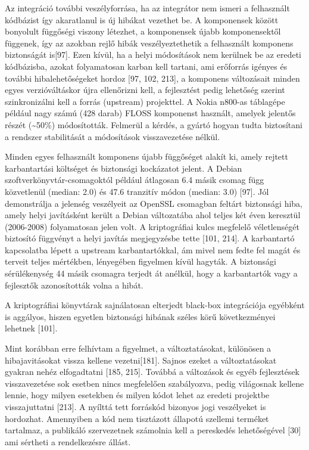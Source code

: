 \documentclass[12pt,magyar,a4paper,oneside]{scrreprt}
\begin{document}
Az integráció további veszélyforrása, ha az integrátor nem ismeri a
felhasznált kódbázist így akaratlanul is új hibákat vezethet be. A
komponensek között bonyolult függőségi viszony létezhet, a komponensek
újabb komponensektől függenek, így az azokban rejlő hibák
veszélyeztethetik a felhasznált komponens biztonságát is{[}97{]}. Ezen
kívül, ha a helyi módosítások nem kerülnek be az eredeti kódbázisba,
azokat folyamatosan karban kell tartani, ami erőforrás igényes és
további hibalehetőségeket hordoz {[}97, 102, 213{]}, a komponens
változásait minden egyes verzióváltáskor újra ellenőrizni kell, a
fejlesztést pedig lehetőség szerint szinkronizálni kell a forrás
(upstream) projekttel. A Nokia n800-as táblagépe például nagy számú (428
darab) FLOSS komponenst használt, amelyek jelentős részét
(\textasciitilde{}50\%) módosították. Felmerül a kérdés, a gyártó hogyan
tudta biztosítani a rendszer stabilitását a módosítások visszavezetése
nélkül.

Minden egyes felhasznált komponens újabb függőséget alakít ki, amely
rejtett karbantartási költséget és biztonsági kockázatot jelent. A
Debian szoftverkönyvtár-csomagoktól például átlagosan 6.4 másik csomag
függ közvetlenül (median: 2.0) és 47.6 tranzitív módon (median: 3.0)
{[}97{]}. Jól demonstrálja a jelenség veszélyeit az OpenSSL csomagban
feltárt biztonsági hiba, amely helyi javításként került a Debian
változatába ahol teljes két éven keresztül (2006-2008) folyamatosan
jelen volt. A kriptográfiai kulcs megfelelő véletlenségét biztosító
függvényt a helyi javítás megjegyzésbe tette {[}101, 214{]}. A
karbantartó kapcsolatba lépett a upstream karbantartókkal, ám mivel nem
fedte fel magát és terveit teljes mértékben, lényegében figyelmen kívül
hagyták. A biztonsági sérülékenység 44 másik csomagra terjedt át
anélkül, hogy a karbantartók vagy a fejlesztők azonosították volna a
hibát.

A kriptográfiai könyvtárak sajnálatosan elterjedt black-box integrációja
egyébként is aggályos, hiszen egyetlen biztonsági hibának széles körű
következményei lehetnek {[}101{]}.

Mint korábban erre felhívtam a figyelmet, a változtatásokat, különösen a
hibajavitásokat vissza kellene vezetni{[}181{]}. Sajnos ezeket a
változtatásokat gyakran nehéz elfogadtatni {[}185, 215{]}. Továbbá a
változások és egyéb fejlesztések visszavezetése sok esetben nincs
megfelelően szabályozva, pedig világosnak kellene lennie, hogy milyen
esetekben és milyen kódot lehet az eredeti projektbe visszajuttatni
{[}213{]}. A nyílttá tett forráskód bizonyos jogi veszélyeket is
hordozhat. Amennyiben a kód nem tisztázott állapotú szellemi terméket
tartalmaz, a publikáló szervezetnek számolnia kell a pereskedés
lehetőségével {[}30{]} ami sértheti a rendelkezésre állást.
\end{document}
